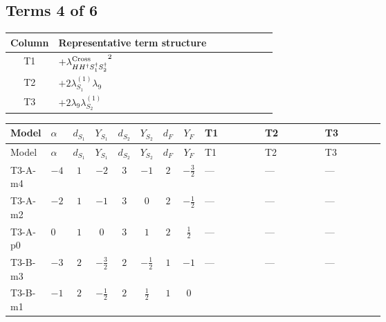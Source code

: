 \documentclass[8pt]{article}
\begin{document}
\begin{landscape}
\subsection*{Terms 4 of 6}
\begin{center}
\begin{tabular}{@{}c >{\raggedright\arraybackslash}p{0.82\linewidth}@{}}
\toprule
Column & Representative term structure \\
\midrule
T1 & \(\displaystyle +{\lambda_{H H^\dagger S_1^\dagger S_2^\dagger}^{\rm Cross}}^2\) \\
\midrule
T2 & \(\displaystyle +2 {\lambda_{S_1}^{(1)}} {\lambda_{9}}\) \\
\midrule
T3 & \(\displaystyle +2 {\lambda_{9}} {\lambda_{S_2}^{(1)}}\) \\
\midrule
\bottomrule
\end{tabular}
\end{center}
\smallskip
\tiny
\begin{longtable}{@{}llcccccc >{\raggedright\arraybackslash}p{0.21\linewidth} >{\raggedright\arraybackslash}p{0.21\linewidth} >{\raggedright\arraybackslash}p{0.21\linewidth}@{}}
\toprule
Model & $\alpha$ & $d_{S_1}$ & $Y_{S_1}$ & $d_{S_2}$ & $Y_{S_2}$ & $d_F$ & $Y_F$ & T1 & T2 & T3 \\
\midrule
\endfirsthead
\toprule
Model & $\alpha$ & $d_{S_1}$ & $Y_{S_1}$ & $d_{S_2}$ & $Y_{S_2}$ & $d_F$ & $Y_F$ & T1 & T2 & T3 \\
\midrule
\endhead
T3-A-m4 & $-4$ & $1$ & $-2$ & $3$ & $-1$ & $2$ & $-\frac{3}{2}$ & --- & --- & --- \\
\midrule
T3-A-m2 & $-2$ & $1$ & $-1$ & $3$ & $0$ & $2$ & $-\frac{1}{2}$ & --- & --- & --- \\
\midrule
T3-A-p0 & $0$ & $1$ & $0$ & $3$ & $1$ & $2$ & $\frac{1}{2}$ & --- & --- & --- \\
\midrule
T3-B-m3 & $-3$ & $2$ & $-\frac{3}{2}$ & $2$ & $-\frac{1}{2}$ & $1$ & $-1$ & --- & --- & --- \\
\midrule
T3-B-m1 & $-1$ & $2$ & $-\frac{1}{2}$ & $2$ & $\frac{1}{2}$ & $1$ & $0$ & \scriptsize\adjustbox{max width=\linewidth}{$\begin{gathered} +{\lambda_{H H^\dagger S_1^\dagger S_2^\dagger}^{\rm Cross}}^2\end{gathered}$} & \scriptsize\adjustbox{max width=\linewidth}{$\begin{gathered} +2 {\lambda_{S_1}^{(1)}} {\lambda_{9}}\end{gathered}$} & \scriptsize\adjustbox{max width=\linewidth}{$\begin{gathered} +2 {\lambda_{9}} {\lambda_{S_2}^{(1)}}\end{gathered}$} \\

\end{longtable}
\end{landscape}
\end{document}
